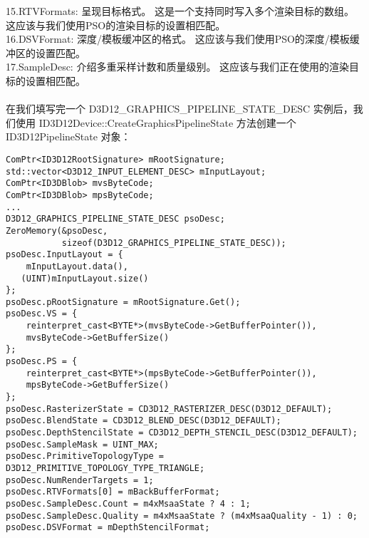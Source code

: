 \begin{flushleft}
15.RTVFormats: 呈现目标格式。 这是一个支持同时写入多个渲染目标的数组。 这应该与我们使用PSO的渲染目标的设置相匹配。\\
16.DSVFormat: 深度/模板缓冲区的格式。 这应该与我们使用PSO的深度/模板缓冲区的设置匹配。\\
17.SampleDesc: 介绍多重采样计数和质量级别。 这应该与我们正在使用的渲染目标的设置相匹配。\\
~\\
在我们填写完一个 D3D12\_GRAPHICS\_PIPELINE\_STATE\_DESC 实例后，我们使用 ID3D12Device::CreateGraphicsPipelineState 方法创建一个 ID3D12PipelineState 对象：\\
\begin{lstlisting}
ComPtr<ID3D12RootSignature> mRootSignature;
std::vector<D3D12_INPUT_ELEMENT_DESC> mInputLayout;
ComPtr<ID3DBlob> mvsByteCode;
ComPtr<ID3DBlob> mpsByteCode;
...
D3D12_GRAPHICS_PIPELINE_STATE_DESC psoDesc;
ZeroMemory(&psoDesc, 
           sizeof(D3D12_GRAPHICS_PIPELINE_STATE_DESC));
psoDesc.InputLayout = {
    mInputLayout.data(),
   (UINT)mInputLayout.size()
};
psoDesc.pRootSignature = mRootSignature.Get();
psoDesc.VS = {
    reinterpret_cast<BYTE*>(mvsByteCode->GetBufferPointer()),
    mvsByteCode->GetBufferSize()
};
psoDesc.PS = {
    reinterpret_cast<BYTE*>(mpsByteCode->GetBufferPointer()),
    mpsByteCode->GetBufferSize()
};
psoDesc.RasterizerState = CD3D12_RASTERIZER_DESC(D3D12_DEFAULT);
psoDesc.BlendState = CD3D12_BLEND_DESC(D3D12_DEFAULT);
psoDesc.DepthStencilState = CD3D12_DEPTH_STENCIL_DESC(D3D12_DEFAULT);
psoDesc.SampleMask = UINT_MAX;
psoDesc.PrimitiveTopologyType = D3D12_PRIMITIVE_TOPOLOGY_TYPE_TRIANGLE;
psoDesc.NumRenderTargets = 1;
psoDesc.RTVFormats[0] = mBackBufferFormat;
psoDesc.SampleDesc.Count = m4xMsaaState ? 4 : 1;
psoDesc.SampleDesc.Quality = m4xMsaaState ? (m4xMsaaQuality - 1) : 0;
psoDesc.DSVFormat = mDepthStencilFormat;


\end{lstlisting}
\end{flushleft}
